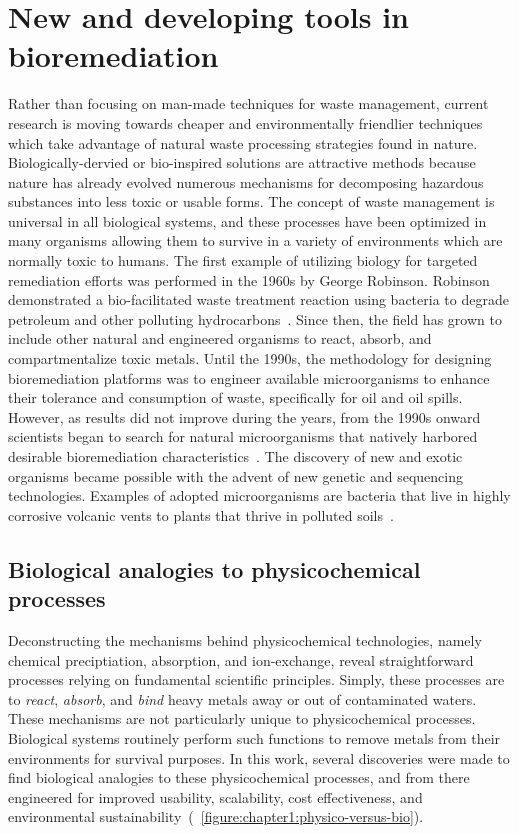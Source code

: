 \documentclass[../main/main]{subfiles}
\begin{document}
\section{New and developing tools in bioremediation}
Rather than focusing on man-made techniques for waste management, current research is moving towards cheaper and environmentally friendlier techniques which take advantage of natural waste processing strategies found in nature. Biologically-dervied or bio-inspired solutions are attractive methods because nature has already evolved numerous mechanisms for decomposing hazardous substances into less toxic or usable forms. The concept of waste management is universal in all biological systems, and these processes have been optimized in many organisms allowing them to survive in a variety of environments which are normally toxic to humans. The first example of utilizing biology for targeted remediation efforts was performed in the 1960s by George Robinson. Robinson demonstrated a bio-facilitated waste treatment reaction using bacteria to degrade petroleum and other polluting hydrocarbons~\cite{sonawdekar2012bioremediation}. Since then, the field has grown to include other natural and engineered organisms to react, absorb, and compartmentalize toxic metals. Until the 1990s, the methodology for designing bioremediation platforms was to engineer available microorganisms to enhance their tolerance and consumption of waste, specifically for oil and oil spills. However, as results did not improve during the years, from the 1990s onward scientists began to search for natural microorganisms that natively harbored desirable bioremediation characteristics~\cite{sonawdekar2012bioremediation,antizar-ladislao2010}. The discovery of new and exotic organisms became possible with the advent of new genetic and sequencing technologies.
Examples of adopted microorganisms are bacteria that live in highly corrosive volcanic vents to plants that thrive in polluted soils~\cite{bull2000search}.

\subsection{Biological analogies to physicochemical processes}
\label{section:chapter1:biological-analogies}
Deconstructing the mechanisms behind physicochemical technologies, namely chemical preciptiation, absorption, and ion-exchange, reveal straightforward processes relying on fundamental scientific principles. Simply, these processes are to \textit{react}, \textit{absorb}, and \textit{bind} heavy metals away or out of contaminated waters. These mechanisms are not particularly unique to physicochemical processes. Biological systems routinely perform such functions to remove metals from their environments for survival purposes. In this work, several discoveries were made to find biological analogies to these physicochemical processes, and from there engineered for improved usability, scalability, cost effectiveness, and environmental sustainability~(\FIGURE~\ref{figure:chapter1:physico-versus-bio}).
\end{document}
